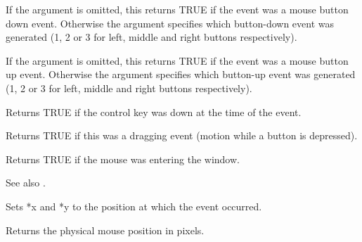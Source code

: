 

If the argument is omitted, this returns TRUE if the event was a mouse
button down event. Otherwise the argument specifies which button-down event
was generated (1, 2 or 3 for left, middle and right buttons respectively).



If the argument is omitted, this returns TRUE if the event was a mouse
button up event. Otherwise the argument specifies which button-up event
was generated (1, 2 or 3 for left, middle and right buttons respectively).



Returns TRUE if the control key was down at the time of the event.



Returns TRUE if this was a dragging event (motion while a button is depressed).

\label{wxmouseevententering}


Returns TRUE if the mouse was entering the window.

See also .

\label{wxmouseeventgetposition}




Sets *x and *y to the position at which the event occurred.

Returns the physical mouse position in pixels.

\label{wxmouseeventgetlogicalposition}


